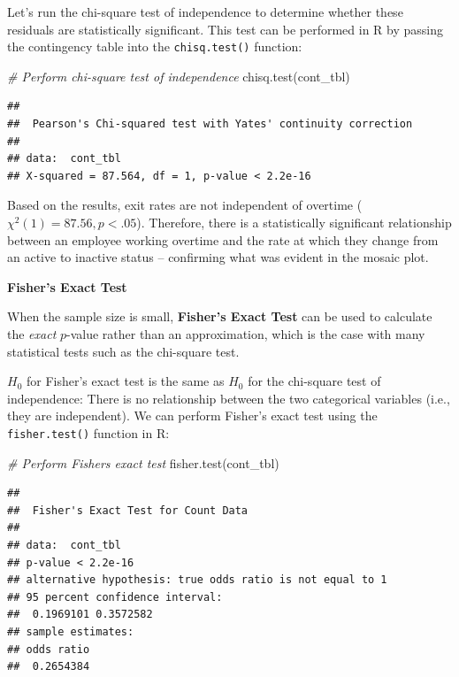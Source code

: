 \documentclass[
]{book}
\newenvironment{Shaded}{\begin{snugshade}}{\end{snugshade}}
\newcommand{\CommentTok}[1]{\textcolor[rgb]{0.56,0.35,0.01}{\textit{#1}}}
\newcommand{\FunctionTok}[1]{\textcolor[rgb]{0.00,0.00,0.00}{#1}}
\newcommand{\NormalTok}[1]{#1}
\begin{document}
Let's run the chi-square test of independence to determine whether these residuals are statistically significant. This test can be performed in R by passing the contingency table into the \texttt{chisq.test()} function:

\begin{Shaded}
\begin{Highlighting}[]
\CommentTok{\# Perform chi{-}square test of independence}
\FunctionTok{chisq.test}\NormalTok{(cont\_tbl)}
\end{Highlighting}
\end{Shaded}

\begin{verbatim}
## 
##  Pearson's Chi-squared test with Yates' continuity correction
## 
## data:  cont_tbl
## X-squared = 87.564, df = 1, p-value < 2.2e-16
\end{verbatim}

Based on the results, exit rates are not independent of overtime (\({\chi}^2(1) = 87.56, p < .05\)). Therefore, there is a statistically significant relationship between an employee working overtime and the rate at which they change from an active to inactive status -- confirming what was evident in the mosaic plot.

\textbf{Fisher's Exact Test}

When the sample size is small, \textbf{Fisher's Exact Test} can be used to calculate the \emph{exact} \(p\)-value rather than an approximation, which is the case with many statistical tests such as the chi-square test.

\(H_0\) for Fisher's exact test is the same as \(H_0\) for the chi-square test of independence: There is no relationship between the two categorical variables (i.e., they are independent). We can perform Fisher's exact test using the \texttt{fisher.test()} function in R:

\begin{Shaded}
\begin{Highlighting}[]
\CommentTok{\# Perform Fisher\textquotesingle{}s exact test}
\FunctionTok{fisher.test}\NormalTok{(cont\_tbl)}
\end{Highlighting}
\end{Shaded}

\begin{verbatim}
## 
##  Fisher's Exact Test for Count Data
## 
## data:  cont_tbl
## p-value < 2.2e-16
## alternative hypothesis: true odds ratio is not equal to 1
## 95 percent confidence interval:
##  0.1969101 0.3572582
## sample estimates:
## odds ratio 
##  0.2654384
\end{verbatim}
\end{document}
